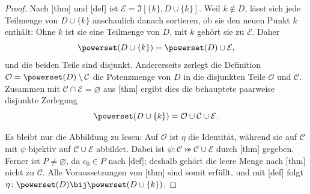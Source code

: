 \documentclass[main.tex]{subfiles}
\begin{document}
\begin{proof}
Nach [thm] und
[def] ist
\(\mathcal E=\mathfrak I[\{k\},D\cup\{k\}]\). Weil \(k\notin D\),
lässt sich jede Teilmenge von \(D\cup\{k\}\) anschaulich danach
sortieren, ob sie den neuen Punkt \(k\) enthält: Ohne \(k\) ist sie eine
Teilmenge von \(D\), mit \(k\) gehört sie zu \(\mathcal E\). Daher
\[
  \powerset(D\cup\{k\})=\powerset(D)\cup\mathcal E,
\]
und die beiden Teile sind disjunkt. Andererseits zerlegt die Definition
\(\mathcal O=\powerset(D)\setminus\mathcal C\) die Potenzmenge von \(D\)
in die disjunkten Teile \(\mathcal O\) und \(\mathcal C\). Zusammen mit
\(\mathcal C\cap\mathcal E=\varnothing\) aus
[thm] ergibt dies die
behauptete paarweise disjunkte Zerlegung
\[
  \powerset(D\cup\{k\})=\mathcal O\cup\mathcal C\cup\mathcal E.
\]

Es bleibt nur die Abbildung zu lesen: Auf \(\mathcal O\) ist \(\eta\)
die Identität, während sie auf \(\mathcal C\) mit \(\psi\) bijektiv auf
\(\mathcal C\cup\mathcal E\) abbildet. Dabei ist
\(\psi\colon\mathcal C\bij\mathcal C\cup\mathcal E\) durch
[thm] gegeben. Ferner
ist \(P\neq\varnothing\), da \(c_0\in P\) nach
[def]; deshalb gehört die leere
Menge nach [thm] nicht zu
\(\mathcal C\). Alle Voraussetzungen von
[thm] sind somit erfüllt, und
mit [def] folgt
\(\eta\colon\powerset(D)\bij\powerset(D\cup\{k\})\).
\end{proof}
\end{document}
